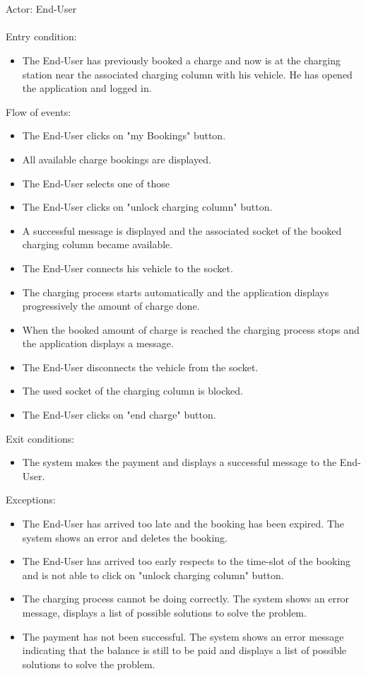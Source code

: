 \documentclass[a4paper]{report}
\begin{document}
\\ \\
Actor: End-User \\ \\
Entry condition:
\begin{itemize}
\item The End-User has previously booked a charge and now is at the charging station near the associated charging column with his vehicle. He has opened the application and logged in.
\end{itemize}
Flow of events:
\begin{itemize}
\item The End-User clicks on "my Bookings" button.
\item All available charge bookings are displayed.
\item The End-User selects one of those
\item The End-User clicks on "unlock charging column" button.
\item A successful message is displayed and the associated socket of the booked charging column became available.
\item The End-User connects his vehicle to the socket.
\item The charging process starts automatically and the application displays progressively the amount of charge done.
\item When the booked amount of charge is reached the charging process stops and the application displays a message.
\item The End-User disconnects the vehicle from the socket.
\item The used socket of the charging column is blocked.
\item The End-User clicks on "end charge" button.
\end{itemize}
Exit conditions:
\begin{itemize}
\item The system makes the payment and displays a successful message to the End-User.
\end{itemize}
Exceptions:
\begin{itemize}
\item The End-User has arrived too late and the booking has been expired. The system shows an error and deletes the booking.
\item The End-User has arrived too early respects to the time-slot of the booking and is not able to click on "unlock charging column" button.
\item The charging process cannot be doing correctly. The system shows an error message, displays a list of possible solutions to solve the problem.
\item The payment has not been successful. The system shows an error message indicating that the balance is still to be paid and displays a list of possible solutions to solve the problem.
\end{itemize}
\end{document}
